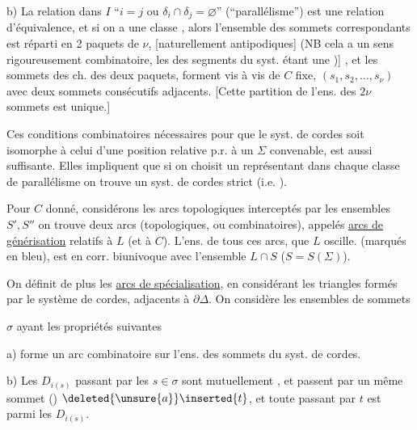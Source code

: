 b) La relation dans $I$ ``$i=j$ ou  $\delta_i\cap\delta_j=\varnothing$''  (``parallélisme'') est une relation d'équivalence, et  si on a une classe  , alors l'ensemble des \inserted{$2\nu$} sommets correspondants est réparti en 2 paquets  de $\nu$,  [naturellement antipodiques] (NB cela a un sens rigoureusement combinatoire, les  des segments du syst. étant une )] , et les sommets des ch. des deux paquets, forment vis à vis de $C$ fixe, $(s_1,s_2,\ldots,s_\nu)$ avec deux sommets consécutifs adjacents. [Cette partition de l'ens.  des $2\nu$ sommets est unique.]

Ces conditions combinatoires nécessaires pour que le syst. de cordes soit isomorphe à celui d'une position relative p.r. à un $\Sigma$ convenable, est aussi suffisante. Elles impliquent que si on choisit un représentant dans chaque classe de parallélisme on trouve un syst. de cordes strict (i.e. ).

Pour $C$ donné, considérons les arcs topologiques interceptés par les ensembles $S',S''$ on trouve deux arcs (topologiques, ou combinatoires), appelés \uline{arcs de générisation} relatifs à $L$ (et à $C$). L'ens. de tous ces arcs, que $L$ oscille. (marqués en bleu),  est en corr. biunivoque avec l'ensemble $L\cap S$ ($S=S(\Sigma)$). 

On définit de plus les \uline{arcs de spécialisation}, en considérant les triangles formés par le système de cordes, adjacents à $\partial\Delta$. On considère les ensembles de sommets

$\sigma$ ayant les propriétés suivantes 

a)  \inserted{$\sigma$} forme un arc combinatoire sur l'ens. des sommets du syst. de cordes.

b) Les $D_{i(s)}$ passant par les $s\in\sigma$ sont mutuellement , et passent par un même sommet () $\deleted{\unsure{a}}\inserted{t}$, et toute  passant par $t$ est parmi les $D_{i(s)}$.

